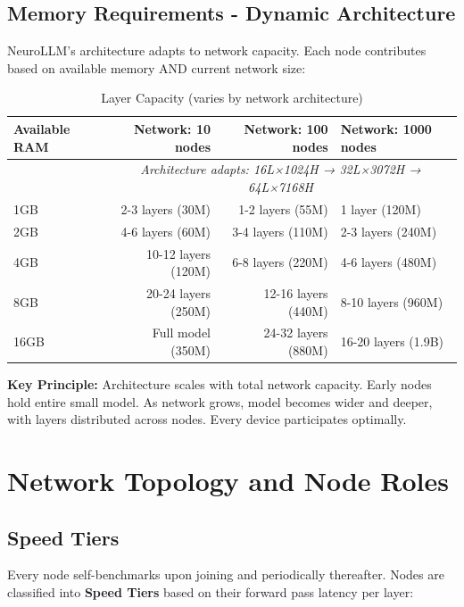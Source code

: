 \documentclass[11pt,a4paper]{article}
\begin{document}
\subsection{Memory Requirements - Dynamic Architecture}

NeuroLLM's architecture adapts to network capacity. Each node contributes based on available memory AND current network size:

\begin{table}[H]
\centering
\caption{Layer Capacity (varies by network architecture)}
\begin{tabular}{@{}lrrl@{}}
\toprule
\textbf{Available RAM} & \textbf{Network: 10 nodes} & \textbf{Network: 100 nodes} & \textbf{Network: 1000 nodes} \\
\midrule
& \multicolumn{3}{c}{\textit{Architecture adapts: 16L×1024H → 32L×3072H → 64L×7168H}} \\
\midrule
1GB & 2-3 layers (30M) & 1-2 layers (55M) & 1 layer (120M) \\
2GB & 4-6 layers (60M) & 3-4 layers (110M) & 2-3 layers (240M) \\
4GB & 10-12 layers (120M) & 6-8 layers (220M) & 4-6 layers (480M) \\
8GB & 20-24 layers (250M) & 12-16 layers (440M) & 8-10 layers (960M) \\
16GB & Full model (350M) & 24-32 layers (880M) & 16-20 layers (1.9B) \\
\bottomrule
\end{tabular}
\end{table}

\textbf{Key Principle:} Architecture scales with total network capacity. Early nodes hold entire small model. As network grows, model becomes wider and deeper, with layers distributed across nodes. Every device participates optimally.

\section{Network Topology and Node Roles}

\subsection{Speed Tiers}

Every node self-benchmarks upon joining and periodically thereafter. Nodes are classified into \textbf{Speed Tiers} based on their forward pass latency per layer:
\end{document}
